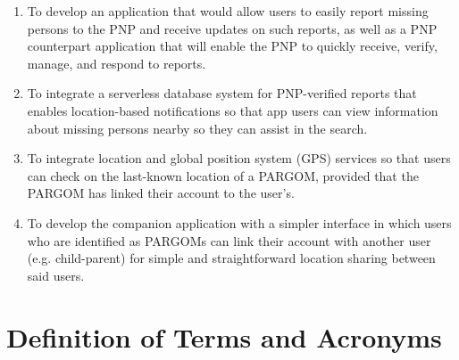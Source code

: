 \begin{enumerate}
   \item To develop an application that would allow users to easily report missing persons to the PNP and receive updates on such reports, as well as a PNP counterpart application that will enable the PNP to quickly receive, verify, manage, and respond to reports.
   \item To integrate a serverless database system for PNP-verified reports that enables location-based notifications so that app users can view information about missing persons nearby so they can assist in the search.
   \item To integrate location and global position system (GPS) services so that users can check on the last-known location of a PARGOM, provided that the PARGOM has linked their account to the user’s.
   \item To develop the companion application with a simpler interface in which users who are identified as PARGOMs can link their account with another user (e.g. child-parent) for simple and straightforward location sharing between said users.
\end{enumerate}

\section{ Definition of Terms and Acronyms}

